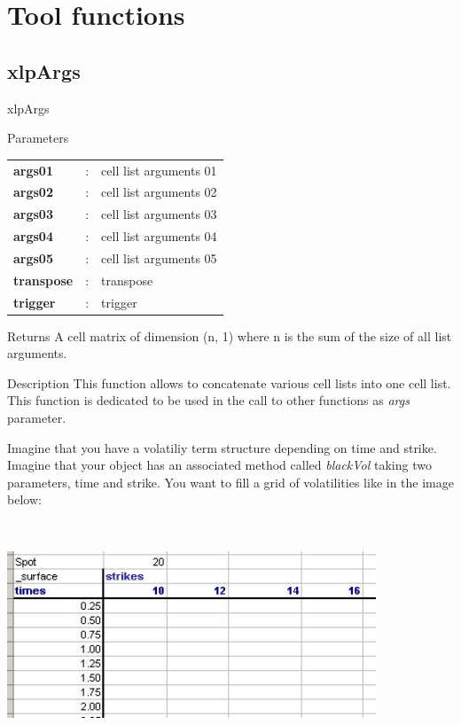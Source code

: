 \section{Tool functions}


\subsection{xlpArgs}

\begin{xlpfunctitle}{xlpArgs}

\begin{xlpfunc}{Parameters}
\begin{tabular}{p{3.5cm}cl}
\textbf{args01}& : & cell list arguments 01 \\
\textbf{args02}& : & cell list arguments 02 \\
\textbf{args03}& : & cell list arguments 03 \\
\textbf{args04}& : & cell list arguments 04 \\
\textbf{args05}& : & cell list arguments 05 \\
\textbf{transpose}& : & transpose \\
\textbf{trigger}& : & trigger 
\end{tabular}
\end{xlpfunc}


\begin{xlpfunc}{Returns}
A cell matrix of dimension (n, 1) where n is the sum of the size of all list arguments.
\end{xlpfunc}

\begin{xlpfunc}{Description}
This function allows to concatenate various cell lists into one cell list.
This function is dedicated to be used in the call to other functions as {\it args} parameter.

Imagine that you have a volatiliy term structure depending on time and strike. Imagine that your object has an associated method called {\it blackVol} taking two parameters, time and strike. You want to fill a grid of volatilities like in the image below:

\

\includegraphics[width=11cm]{images/surface.jpg}


\end{xlpfunc}
\end{xlpfunctitle}
